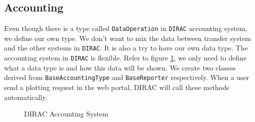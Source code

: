 \subsection{Accounting}

Even though there is a type called {\tt DataOperation} in {\tt DIRAC}
accounting system,
we define our own type. We don't want to mix the data between 
transfer system and the other systems in {\tt DIRAC}.
It is also a try to have our own data type.
The accounting system 
in {\tt DIRAC} is flexible. Refer to figure \ref{fig:acct},
we only need to define 
what a data type is and how this data will be shown.
We create two classes derived from {\tt BaseAccountingType}
and {\tt BaseReporter} respectively.
When a user send a plotting request in the web portal, 
DIRAC will call these methods automatically.
\begin{figure}[htbp]
    
    \caption{\label{fig:acct}DIRAC Accounting System}
\end{figure}
